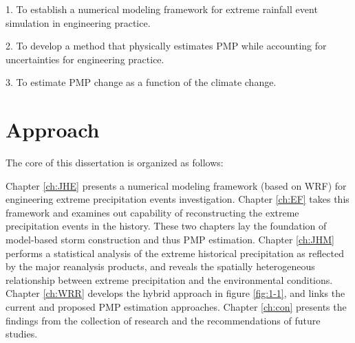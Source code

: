 1. To establish a numerical modeling framework for extreme rainfall event simulation in engineering practice.

2. To develop a method that physically estimates PMP while accounting for uncertainties for engineering practice.

3. To estimate PMP change as a function of the climate change.

\section {Approach}

The core of this dissertation is organized as follows:

Chapter \ref{ch:JHE} presents a numerical modeling framework (based on WRF) for engineering extreme precipitation events investigation. Chapter \ref{ch:EF} takes this framework and examines out capability of reconstructing the extreme precipitation events in the history. These two chapters lay the foundation of model-based storm construction and thus PMP estimation. Chapter \ref{ch:JHM} performs a statistical analysis of the extreme historical precipitation as reflected by the major reanalysis products, and reveals the spatially heterogeneous relationship between extreme precipitation and the environmental conditions. Chapter \ref{ch:WRR} develops the hybrid approach in figure \ref{fig:1-1}, and links the current and proposed PMP estimation approaches. Chapter \ref{ch:con} presents the findings from the collection of research and the recommendations of future studies.

